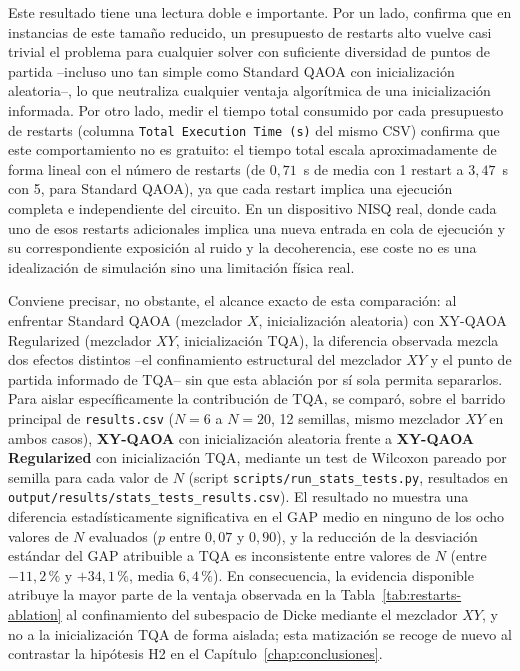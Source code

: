 Este resultado tiene una lectura doble e importante. Por un lado, confirma que en instancias de este tamaño reducido, un presupuesto de restarts alto vuelve casi trivial el problema para cualquier solver con suficiente diversidad de puntos de partida --incluso uno tan simple como Standard QAOA con inicialización aleatoria--, lo que neutraliza cualquier ventaja algorítmica de una inicialización informada. Por otro lado, medir el tiempo total consumido por cada presupuesto de restarts (columna \texttt{Total Execution Time (s)} del mismo CSV) confirma que este comportamiento no es gratuito: el tiempo total escala aproximadamente de forma lineal con el número de restarts (de $0{,}71$~s de media con 1 restart a $3{,}47$~s con 5, para Standard QAOA), ya que cada restart implica una ejecución completa e independiente del circuito. En un dispositivo NISQ real, donde cada uno de esos restarts adicionales implica una nueva entrada en cola de ejecución y su correspondiente exposición al ruido y la decoherencia, ese coste no es una idealización de simulación sino una limitación física real.

Conviene precisar, no obstante, el alcance exacto de esta comparación: al enfrentar Standard
QAOA (mezclador $X$, inicialización aleatoria) con XY-QAOA Regularized (mezclador $XY$,
inicialización TQA), la diferencia observada mezcla dos efectos distintos --el confinamiento
estructural del mezclador $XY$ y el punto de partida informado de TQA-- sin que esta ablación
por sí sola permita separarlos. Para aislar específicamente la contribución de TQA, se comparó,
sobre el barrido principal de \texttt{results.csv} ($N=6$ a $N=20$, 12 semillas, mismo mezclador
$XY$ en ambos casos), \textbf{XY-QAOA} con inicialización aleatoria frente a \textbf{XY-QAOA
Regularized} con inicialización TQA, mediante un test de Wilcoxon pareado por semilla para cada
valor de $N$ (script \texttt{scripts/run\_stats\_tests.py}, resultados en
\texttt{output/results/stats\_tests\_results.csv}). El resultado no muestra una diferencia
estadísticamente significativa en el GAP medio en ninguno de los ocho valores de $N$ evaluados
($p$ entre $0{,}07$ y $0{,}90$), y la reducción de la desviación estándar del GAP atribuible a
TQA es inconsistente entre valores de $N$ (entre $-11{,}2\,\%$ y $+34{,}1\,\%$, media
$6{,}4\,\%$). En consecuencia, la evidencia disponible atribuye la mayor parte de la ventaja
observada en la Tabla~\ref{tab:restarts-ablation} al confinamiento del subespacio de Dicke
mediante el mezclador $XY$, y no a la inicialización TQA de forma aislada; esta matización se
recoge de nuevo al contrastar la hipótesis H2 en el Capítulo~\ref{chap:conclusiones}.

